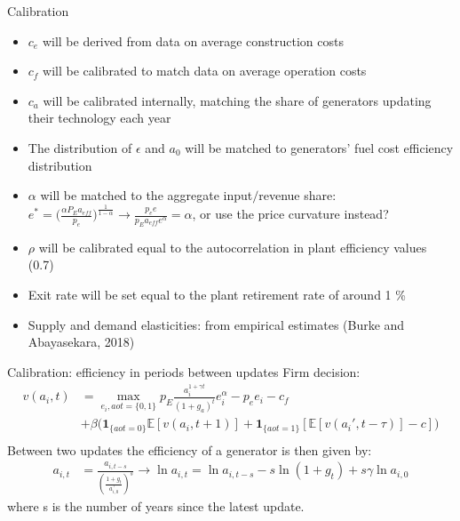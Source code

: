 \documentclass{beamer}
\begin{document}
\begin{frame}{Calibration}
    \begin{itemize}
        \item $c_e$ will be derived from data on average construction costs
        \item $c_f$ will be calibrated to match data on average operation costs 
        \item $c_a$ will be calibrated internally, matching the share of generators updating their technology each year
        \item The distribution of $\epsilon$ and $a_0$ will be matched to generators' fuel cost efficiency distribution
        \item $\alpha$ will be matched to the aggregate input$/$revenue share: $e^* = \big(\frac{\alpha P_E a_{eff}}{p_e}\big)^\frac{1}{1-\alpha}\rightarrow\frac{p_ee}{p_Ea_{eff}e^\alpha}=\alpha$, or use the price curvature instead?
         \item $\rho$ will be calibrated equal to the autocorrelation in plant efficiency values (0.7)
        \item Exit rate will be set equal to the plant retirement rate of around 1 \%
        \item Supply and demand elasticities: from empirical estimates (Burke and Abayasekara, 2018)
    \end{itemize}
\end{frame}
\begin{frame}{Calibration: efficiency in periods between updates}\label{effic_between_model}
Firm decision:\\
\begin{align*} 
    v(a_{i},t) &= \max_{e_i,aot=\{0,1\}} p_E\frac{a_{i}^{1+\gamma t}}{(1+g_a)^t} e_i^\alpha -p_e e_i-c_f\\ 
    &+\beta \big(\mathbf{1}_{\{aot =0\}} \mathbb{E}[v(a_{i},t+1)] + \mathbf{1}_{\{aot =1\}}[ \mathbb{E}[v(a_{i}',t-\tau)]-c]\big)\\
\end{align*}
Between two updates the efficiency of a generator is then given by:\\
\begin{align*}
    a_{i,t} &= \frac{a_{i,t-s}}{(\frac{1+g_t}{a_{i,0}^\gamma})^s}  \rightarrow \ln a_{i,t} = \ln a_{i,t-s} -  s \ln(1+g_t) + s \gamma\ln a_{i,0} 
\end{align*}
where s is the number of years since the latest update.

    \hyperlink{gen_problem}{}
    \hyperlink{transition1}{}
\end{frame}
\end{document}
